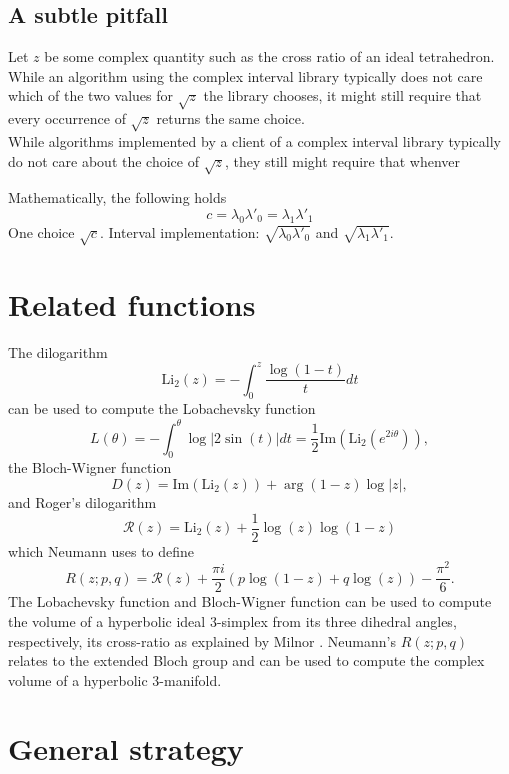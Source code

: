 \documentclass[utopia]{nmd/article}
\def\Li{\mathrm{Li}}
\begin{document}
\subsection{A subtle pitfall} Let $z$ be some complex quantity such as the cross ratio of an ideal tetrahedron. While an algorithm using the complex interval library typically does not care which of the two values for $\sqrt{z}$ the library chooses, it might still require that every occurrence of $\sqrt{z}$ returns the same choice.\\


While algorithms implemented by a client of a complex interval library typically do not care about the choice of $\sqrt{z}$, they still might require that whenver 

Mathematically, the following holds
$$c=\lambda_0 \lambda'_0 = \lambda_1 \lambda'_1$$
One choice $\sqrt{c}$. Interval implementation: $\sqrt{\lambda_0 \lambda'_0}$ and $\sqrt{ \lambda_1 \lambda'_1}$.

\section{Related functions}

The dilogarithm
$$\Li_2(z) = -\int_0^z \frac{\log(1-t)}{t}dt$$
can be used to compute the Lobachevsky function
$$L(\theta)=-\int_0^\theta \log |2\sin(t)| dt = \frac{1}{2} \mathrm{Im}\left(\Li_2\left(e^{2i\theta}\right)\right),$$
the Bloch-Wigner function
$$D(z)=\mathrm{Im}\left(\Li_2(z)\right) + \arg(1-z)\log|z|,$$
and Roger's dilogarithm
$$\mathcal{R}(z)=\Li_2(z)+\frac{1}{2}\log(z)\log(1-z)$$
which Neumann \cite{Neumann} uses to define
$$R(z;p,q)=\mathcal{R}(z)+\frac{\pi i}{2}\left(p\log(1-z)+q\log(z)\right)-\frac{\pi^2}{6}.$$
The Lobachevsky function and Bloch-Wigner function can be used to compute the volume of a hyperbolic ideal 3-simplex from its three dihedral angles, respectively, its cross-ratio as explained by Milnor \cite{Milnor}. Neumann's $R(z;p,q)$ relates to the extended Bloch group and can be used to compute the complex volume of a hyperbolic 3-manifold.



\section{General strategy}
\end{document}
